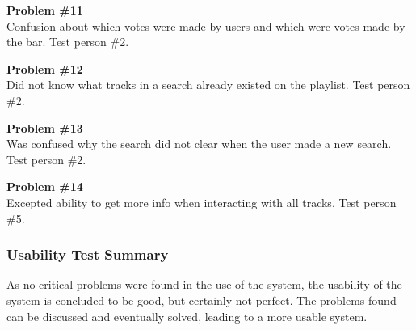 \noindent\textbf{Problem \#11}\\
    Confusion about which votes were made by users and which were
    votes made by the bar. Test person \#2.

\noindent\textbf{Problem \#12}\\
    Did not know what tracks in a search already existed on the
    playlist. Test person \#2.

\noindent\textbf{Problem \#13}\\
    Was confused why the search did not clear when the user made a new
    search. Test person \#2.

\noindent\textbf{Problem \#14}\\
    Excepted ability to get more info when interacting with all
    tracks. Test person \#5.

\subsubsection{Usability Test Summary}

As no critical problems were found in the use of the system, the
usability of the system is concluded to be good, but certainly not
perfect. The problems found can be discussed and eventually
solved, leading to a more usable system.

